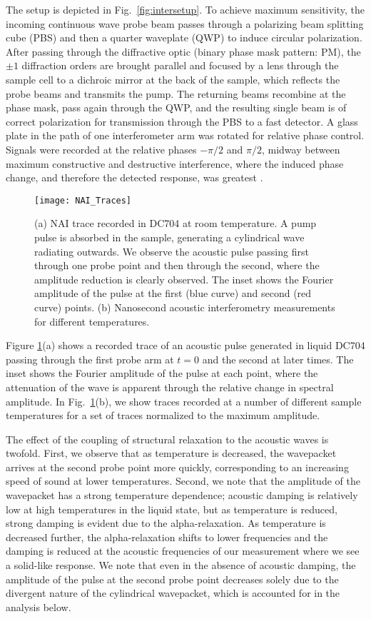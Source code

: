 \documentclass[reprint,showpacs,amsmath,amssymb,aip,jcp]{revtex4-1}
\begin{document}
The setup is depicted in Fig.\ \ref{fig:intersetup}. To achieve
maximum sensitivity, the incoming continuous wave probe beam passes
through a polarizing beam splitting cube (PBS) and then a quarter
waveplate (QWP) to induce circular polarization. After passing through
the diffractive optic (binary phase mask pattern: PM), the $\pm 1$
diffraction orders are brought parallel and focused by a lens through
the sample cell to a dichroic mirror at the back of the sample, which
reflects the probe beams and transmits the pump.  The returning beams
recombine at the phase mask, pass again through the QWP, and the
resulting single beam is of correct polarization for transmission
through the PBS to a fast detector. A glass plate in the path of one
interferometer arm was rotated for relative phase control. Signals
were recorded at the relative phases $-\pi/2$ and $\pi/2$, midway
between maximum constructive and destructive interference, where the
induced phase change, and therefore the detected response, was
greatest \cite{sGlorieux2004}.

\begin{figure}
  \texttt{[image: NAI\_Traces]}
  \caption{\label{fig:tdeptraces}(a) NAI trace recorded in DC704 at
    room temperature. A pump pulse is absorbed in the sample,
    generating a cylindrical wave radiating outwards. We observe the
    acoustic pulse passing first through one probe point and then
    through the second, where the amplitude reduction is clearly
    observed.  The inset shows the Fourier amplitude of the pulse at
    the first (blue curve) and second (red curve) points. (b)
    Nanosecond acoustic interferometry measurements for different
    temperatures.}
\end{figure}

Figure \ref{fig:tdeptraces}(a) shows a recorded trace of an acoustic
pulse generated in liquid DC704 passing through the first probe arm at
$t=0$ and the second at later times.  The inset shows the Fourier
amplitude of the pulse at each point, where the attenuation of the
wave is apparent through the relative change in spectral amplitude. In
Fig.\ \ref{fig:tdeptraces}(b), we show traces recorded at a number of
different sample temperatures for a set of traces normalized to the
maximum amplitude.

The effect of the coupling of structural relaxation to the acoustic
waves is twofold. First, we observe that as temperature is decreased,
the wavepacket arrives at the second probe point more quickly,
corresponding to an increasing speed of sound at lower temperatures.
Second, we note that the amplitude of the wavepacket has a strong
temperature dependence; acoustic damping is relatively low at high
temperatures in the liquid state, but as temperature is reduced,
strong damping is evident due to the alpha-relaxation. As
temperature is decreased further, the alpha-relaxation shifts to
lower frequencies and the damping is reduced at the acoustic
frequencies of our measurement where we see a solid-like response. We
note that even in the absence of acoustic damping, the amplitude of
the pulse at the second probe point decreases solely due to the
divergent nature of the cylindrical wavepacket, which is accounted for
in the analysis below.
\end{document}

